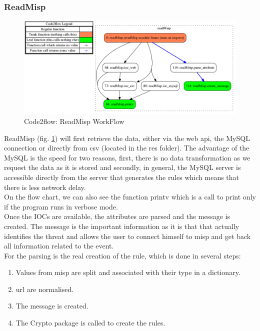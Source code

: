 \documentclass{eplmastersthesis}
\begin{document}
\subsubsection{ReadMisp}
\begin{figure}[h!]
\begin{center}
	\includegraphics[scale=0.3]{res/flowReadMisp}
	\caption{Code2flow: ReadMisp WorkFlow}
	\label{code2flow-readMisp}
\end{center}
\end{figure}

ReadMisp (fig. \ref{code2flow-readMisp}) will first retrieve the data, either via the web \gls{api}, the MySQL connection or directly from \gls{csv} (located in the res folder). The advantage of the MySQL is the speed for two reasons, first, there is no data transformation as we request the data as it is stored and secondly, in general, the MySQL server is accessible directly from the server that generates the rules which means that there is less network delay.\\
On the flow chart, we can also see the function printv which is a call to print only if the program runs in verbose mode.\\
Once the IOCs are available, the attributes are parsed and the message is created. The message is the important information as it is that that actually identifies the threat and allows the user to connect himself to \gls{misp} and get back all information related to the event.\\
For the parsing is the real creation of the rule, which is done in several steps:

\begin{enumerate}
\item Values from \gls{misp} are split and associated with their type in a dictionary.
\item \gls{url} are normalised.
\item The message is created.
\item The Crypto package is called to create the rules.
\end{enumerate}
\end{document}
